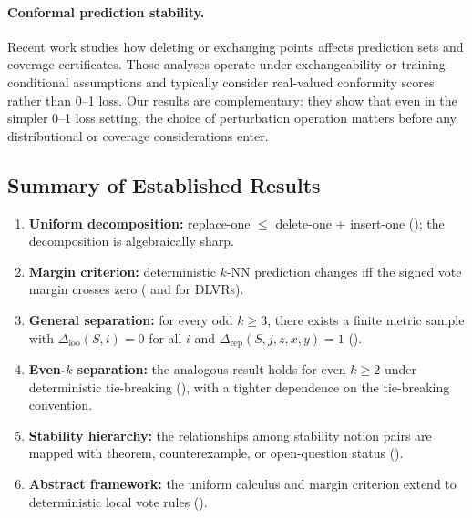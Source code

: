 \paragraph{Conformal prediction stability.}
Recent work \cite{liang2023algorithmic,pournaderi2024training} studies how
deleting or exchanging points affects prediction sets and coverage
certificates. Those analyses operate under exchangeability or
training-conditional assumptions and typically consider real-valued conformity
scores rather than 0--1 loss. Our results are complementary: they show that
even in the simpler 0--1 loss setting, the choice of perturbation operation
matters before any distributional or coverage considerations enter.

\subsection{Summary of Established Results}

\begin{enumerate}[leftmargin=*,label=(\arabic*)]
    \item \textbf{Uniform decomposition:} replace-one $\le$ delete-one +
        insert-one (); the decomposition is algebraically sharp.
    \item \textbf{Margin criterion:} deterministic $k$-NN prediction changes
        iff the signed vote margin crosses zero ( and
         for DLVRs).
    \item \textbf{General separation:} for every odd $k \ge 3$, there exists a
        finite metric sample with $\Delta_{\mathrm{loo}}(S,i)=0$ for all $i$
        and $\Delta_{\mathrm{rep}}(S,j,z,x,y)=1$
        ().
    \item \textbf{Even-$k$ separation:} the analogous result holds for even
        $k \ge 2$ under deterministic tie-breaking
        (), with a tighter dependence on the
        tie-breaking convention.
    \item \textbf{Stability hierarchy:} the relationships among stability
        notion pairs are mapped with theorem, counterexample, or open-question
        status ().
    \item \textbf{Abstract framework:} the uniform calculus and margin criterion
        extend to deterministic local vote rules
        ().
\end{enumerate}

